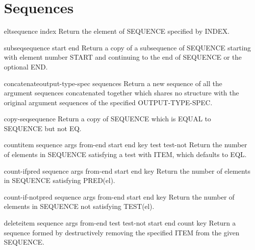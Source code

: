 \chapter{Sequences}

\begin{accessor}{elt}{sequence index}
  Return the element of SEQUENCE specified by INDEX.
\end{accessor}

\begin{accessor}{subseq}{sequence start \op end}
  Return a copy of a subsequence of SEQUENCE starting with element number
   START and continuing to the end of SEQUENCE or the optional END.
\end{accessor}

\begin{function}{concatenate}{output-type-spec \rest sequences}
  Return a new sequence of all the argument sequences concatenated together
  which shares no structure with the original argument sequences of the
  specified OUTPUT-TYPE-SPEC.
\end{function}

\begin{function}{copy-seq}{sequence}
  Return a copy of SEQUENCE which is EQUAL to SEQUENCE but not EQ.
\end{function}

\begin{function}{count}{item sequence \rest args \key from-end start end key test test-not}
  Return the number of elements in SEQUENCE satisfying a test with ITEM,
   which defaults to EQL.
\end{function}

\begin{function}{count-if}{pred sequence \rest args \key from-end start end key}
  Return the number of elements in SEQUENCE satisfying PRED(el).
\end{function}

\begin{function}{count-if-not}{pred sequence \rest args \key from-end start end key}
  Return the number of elements in SEQUENCE not satisfying TEST(el).
\end{function}

\begin{function}{delete}{item sequence \rest args \key from-end test test-not start end count key}
  Return a sequence formed by destructively removing the specified ITEM from
  the given SEQUENCE.
\end{function}

